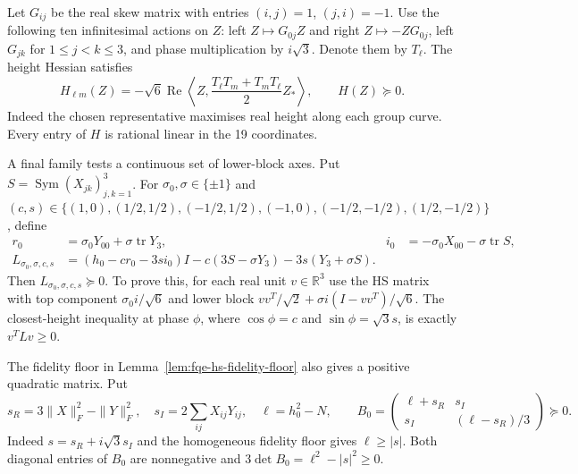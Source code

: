 Let $G_{ij}$ be the real skew matrix with entries $(i,j)=1$,
$(j,i)=-1$. Use the following ten infinitesimal actions on $Z$:
left $Z\mapsto G_{0j}Z$ and right $Z\mapsto-ZG_{0j}$, left $G_{jk}$ for $1\le j<k\le3$, and
phase multiplication by $i\sqrt3$. Denote them by $T_\ell$.
The height Hessian satisfies
\begin{equation}\label{eq:fqe-height-matrix}
 H_{\ell m}(Z)=-\sqrt6\operatorname{Re}
  \left\langle Z,\frac{T_\ell T_m+T_mT_\ell}{2}Z_*\right\rangle,
 \qquad H(Z)\succeq0.
\end{equation}
Indeed the chosen representative maximises real height along each group
curve. Every entry of $H$ is rational linear in the 19 coordinates.

A final family tests a continuous set of lower-block axes. Put
$S=\operatorname{Sym}(X_{jk})_{j,k=1}^3$. For
$\sigma_0,\sigma\in\{\pm1\}$ and
$(c,s)\in\{(1,0),(1/2,1/2),(-1/2,1/2),(-1,0),
(-1/2,-1/2),(1/2,-1/2)\}$, define
\begin{align*}
 r_0&=\sigma_0Y_{00}+\sigma\operatorname{tr}Y_3,&
 i_0&=-\sigma_0X_{00}-\sigma\operatorname{tr}S,\\
 L_{\sigma_0,\sigma,c,s}
   &=(h_0-cr_0-3si_0)I-c(3S-\sigma Y_3)-3s(Y_3+\sigma S).
\end{align*}
Then $L_{\sigma_0,\sigma,c,s}\succeq0$. To prove this, for each real
unit $v\in\mathbb R^3$ use the HS matrix with top component
$\sigma_0i/\sqrt6$ and lower block
$v v^T/\sqrt2+\sigma i(I-vv^T)/\sqrt6$.
The closest-height inequality at phase $\phi$, where
$\cos\phi=c$ and $\sin\phi=\sqrt3s$, is exactly $v^TLv\ge0$.

The fidelity floor in Lemma~\ref{lem:fqe-hs-fidelity-floor} also gives a
positive quadratic matrix. Put
\[
 s_R=3\|X\|_F^2-\|Y\|_F^2,\quad
 s_I=2\sum_{ij}X_{ij}Y_{ij},\quad \ell=h_0^2-N,\qquad
 B_0=\begin{pmatrix}\ell+s_R&s_I\\s_I&(\ell-s_R)/3\end{pmatrix}\succeq0.
\]
Indeed $s=s_R+i\sqrt3s_I$ and the homogeneous fidelity floor gives
$\ell\ge|s|$. Both diagonal entries of $B_0$ are nonnegative and
$3\det B_0=\ell^2-|s|^2\ge0$.

